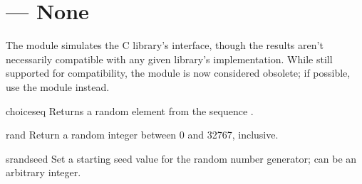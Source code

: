 \section{ ---
         None}



The  module simulates the C library's 
interface, though the results aren't necessarily compatible with any
given library's implementation.  While still supported for
compatibility, the  module is now considered obsolete; if
possible, use the  module instead.


\begin{funcdesc}{choice}{seq}
Returns a random element from the sequence .
\end{funcdesc}

\begin{funcdesc}{rand}{}
Return a random integer between 0 and 32767, inclusive.
\end{funcdesc}

\begin{funcdesc}{srand}{seed}
Set a starting seed value for the random number generator; 
can be an arbitrary integer. 
\end{funcdesc}

\begin{seealso}
\end{seealso}


